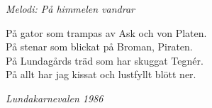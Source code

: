 {\footnotesize\textit{Melodi: På himmelen vandrar}}\par
\vspace{10pt}
På gator som trampas av Ask och von Platen.\\
På stenar som blickat på Broman, Piraten.\\
På Lundagårds träd som har skuggat Tegnér.\\
På allt har jag kissat och lustfyllt blött ner.\par
\vspace{10pt}
{\footnotesize\textit{Lundakarnevalen 1986}}
